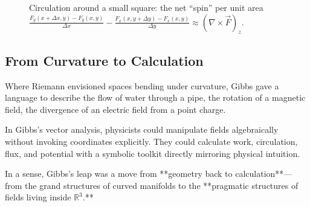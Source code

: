 \begin{figure}[H]
    \centering
    \caption{Circulation around a small square: the net “spin” per unit area 
    \(\displaystyle \frac{F_y(x+\Delta x,y)-F_y(x,y)}{\Delta x}
    - \frac{F_x(x,y+\Delta y)-F_x(x,y)}{\Delta y}
    \approx (\nabla\times \vec F)_z\).}
\end{figure}











\subsection{From Curvature to Calculation}

Where Riemann envisioned spaces bending under curvature,  
Gibbs gave a language to describe the flow of water through a pipe,  
the rotation of a magnetic field,  
the divergence of an electric field from a point charge.

In Gibbs’s vector analysis, physicists could manipulate fields algebraically without invoking coordinates explicitly.  
They could calculate work, circulation, flux, and potential with a symbolic toolkit directly mirroring physical intuition.

In a sense, Gibbs’s leap was a move from **geometry back to calculation**—  
from the grand structures of curved manifolds to the **pragmatic structures of fields living inside \( \mathbb{R}^3 \).**




\medskip


